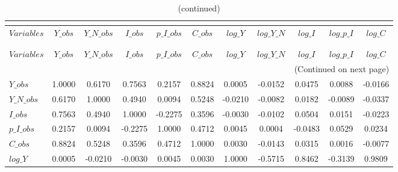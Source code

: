  
\begin{center}
\begin{longtable}{lcccccccccc} 
\caption{MATRIX OF CORRELATIONS}\\
 \label{Table:th_corr_matrix}\\
\toprule 
$Variables  $	 & 	 $      Y\_obs$	 & 	 $  Y\_N\_obs$	 & 	 $      I\_obs$	 & 	 $  p\_I\_obs$	 & 	 $      C\_obs$	 & 	 $      log\_Y$	 & 	 $  log\_Y\_N$	 & 	 $      log\_I$	 & 	 $  log\_p\_I$	 & 	 $      log\_C$\\
\midrule \endfirsthead 
\caption{(continued)}\\
 \toprule \\ 
$Variables  $	 & 	 $      Y\_obs$	 & 	 $  Y\_N\_obs$	 & 	 $      I\_obs$	 & 	 $  p\_I\_obs$	 & 	 $      C\_obs$	 & 	 $      log\_Y$	 & 	 $  log\_Y\_N$	 & 	 $      log\_I$	 & 	 $  log\_p\_I$	 & 	 $      log\_C$\\
\midrule \endhead 
\midrule \multicolumn{11}{r}{(Continued on next page)} \\ \bottomrule \endfoot 
\bottomrule \endlastfoot 
$Y\_obs     $	 & 	       1.0000	 & 	       0.6170	 & 	       0.7563	 & 	       0.2157	 & 	       0.8824	 & 	       0.0005	 & 	      -0.0152	 & 	       0.0475	 & 	       0.0088	 & 	      -0.0166 \\ 
$Y\_N\_obs  $	 & 	       0.6170	 & 	       1.0000	 & 	       0.4940	 & 	       0.0094	 & 	       0.5248	 & 	      -0.0210	 & 	      -0.0082	 & 	       0.0182	 & 	      -0.0089	 & 	      -0.0337 \\ 
$I\_obs     $	 & 	       0.7563	 & 	       0.4940	 & 	       1.0000	 & 	      -0.2275	 & 	       0.3596	 & 	      -0.0030	 & 	      -0.0102	 & 	       0.0504	 & 	       0.0151	 & 	      -0.0223 \\ 
$p\_I\_obs  $	 & 	       0.2157	 & 	       0.0094	 & 	      -0.2275	 & 	       1.0000	 & 	       0.4712	 & 	       0.0045	 & 	       0.0004	 & 	      -0.0483	 & 	       0.0529	 & 	       0.0234 \\ 
$C\_obs     $	 & 	       0.8824	 & 	       0.5248	 & 	       0.3596	 & 	       0.4712	 & 	       1.0000	 & 	       0.0030	 & 	      -0.0143	 & 	       0.0315	 & 	       0.0016	 & 	      -0.0077 \\ 
$log\_Y     $	 & 	       0.0005	 & 	      -0.0210	 & 	      -0.0030	 & 	       0.0045	 & 	       0.0030	 & 	       1.0000	 & 	      -0.5715	 & 	       0.8462	 & 	      -0.3139	 & 	       0.9809 \\ 

\end{longtable}
\end{center}
